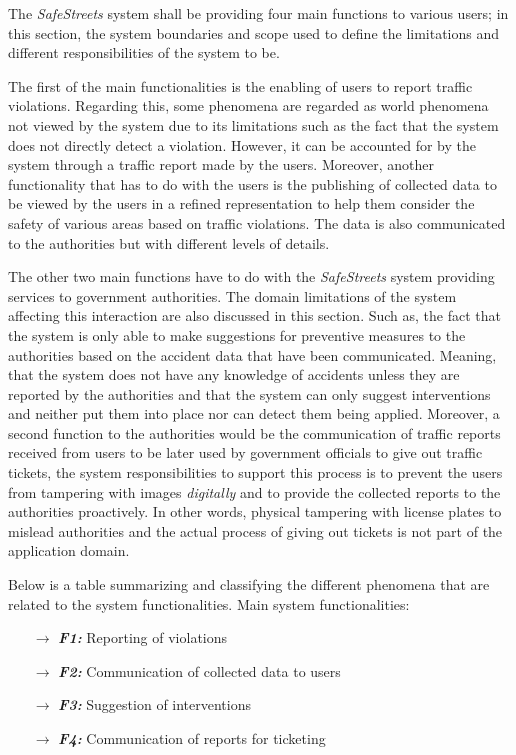 The \emph{SafeStreets} system shall be providing four main functions to various users; in this section, the system boundaries and scope used to define the limitations and different responsibilities of the system to be. 

The first of the main functionalities is the enabling of users to report traffic violations. Regarding this, some phenomena are regarded as world phenomena not viewed by the system due to its limitations such as the fact that the system does not directly detect a violation. However, it can be accounted for by the system through a traffic report made by the users. Moreover, another functionality that has to do with the users is the publishing of collected data to be viewed by the users in a refined representation to help them consider the safety of various areas based on traffic violations. The data is also communicated to the authorities but with different levels of details.

The other two main functions have to do with the \emph{SafeStreets} system providing services to government authorities. The domain limitations of the system affecting this interaction are also discussed in this section. Such as, the fact that the system is only able to make suggestions for preventive measures to the authorities based on the accident data that have been communicated. Meaning, that the system does not have any knowledge of accidents unless they are reported by the authorities and that the system can only suggest interventions and neither put them into place nor can detect them being applied. Moreover, a second function to the authorities would be the communication of traffic reports received from users to be later used by government officials to give out traffic tickets, the system responsibilities to support this process is to prevent the users from tampering with images \emph{digitally} and to provide the collected reports to the authorities proactively. In other words, physical tampering with license plates to mislead authorities and the actual process of giving out tickets is not part of the application domain. 

Below is a table summarizing and classifying the different phenomena that are related to the system functionalities. 
Main system functionalities:

\begin{itemize}
\item[$\rightarrow$] \emph{\textbf{F1:}} Reporting of violations
\item[$\rightarrow$] \emph{\textbf{F2:}} Communication of collected data to users
\item[$\rightarrow$] \emph{\textbf{F3:}} Suggestion of interventions
\item[$\rightarrow$] \emph{\textbf{F4:}} Communication of reports for ticketing
\end{itemize}


